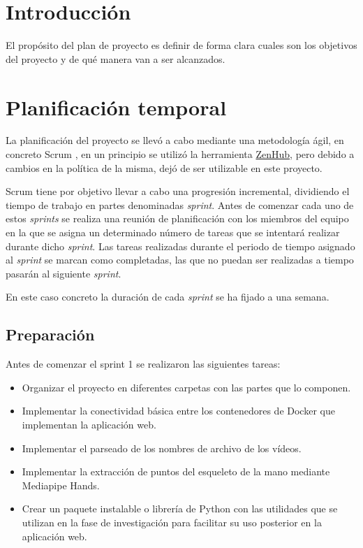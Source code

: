 \label{cha:Plan de Proyecto Software}

\section{Introducción}

El propósito del plan de proyecto es definir de forma clara cuales son los
objetivos del proyecto y de qué manera van a ser alcanzados.

\section{Planificación temporal}

La planificación del proyecto se llevó a cabo mediante una metodología ágil, en
concreto Scrum \cite{schwaber1997scrum}, en un principio se utilizó la
herramienta \href{https://www.zenhub.com/}{ZenHub}, pero debido a cambios en la
política de la misma, dejó de ser utilizable en este proyecto.

Scrum tiene por objetivo llevar a cabo una progresión incremental, dividiendo el
tiempo de trabajo en partes denominadas \textit{sprint}. Antes de comenzar cada
uno de estos \textit{sprints} se realiza una reunión de planificación con los
miembros del equipo en la que se asigna un determinado número de tareas que se
intentará realizar durante dicho \textit{sprint}. Las tareas realizadas durante
el periodo de tiempo asignado al \textit{sprint} se marcan como completadas, las
que no puedan ser realizadas a tiempo pasarán al siguiente \textit{sprint}.

En este caso concreto la duración de cada \textit{sprint} se ha fijado a una
semana.

\subsection{Preparación}

Antes de comenzar el sprint 1 se realizaron las siguientes tareas:

\begin{itemize}
    \item Organizar el proyecto en diferentes carpetas con las partes que lo
          componen.
    \item Implementar la conectividad básica entre los contenedores de Docker
          que implementan la aplicación web.
    \item Implementar el parseado de los nombres de archivo de los vídeos.
    \item Implementar la extracción de puntos del esqueleto de la mano mediante
          Mediapipe Hands.
    \item Crear un paquete instalable o librería de Python con las utilidades
          que se utilizan en la fase de investigación para facilitar su uso
          posterior en la aplicación web.
\end{itemize}

